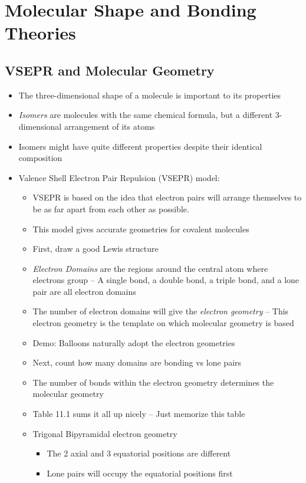 \documentclass[12pt, openany, letterpaper]{memoir}
\begin{document}
\chapter{Molecular Shape and Bonding Theories}
\section{VSEPR and Molecular Geometry}
\begin{itemize}
	\item The three-dimensional shape of a molecule is important to its properties
	\item \emph{Isomers} are molecules with the same chemical formula, but a different 3-dimensional arrangement of its atoms
	\item Isomers might have quite different properties despite their identical composition
	\item Valence Shell Electron Pair Repulsion (VSEPR) model:
	      \begin{itemize}
		      \item VSEPR is based on the idea that electron pairs will arrange themselves to be as far apart from each other as possible.
		      \item This model gives accurate geometries for covalent molecules
		      \item First, draw a good Lewis structure
		      \item \emph{Electron Domains} are the regions around the central atom where electrons group -- A single bond, a double bond, a triple bond, and a lone pair are all electron domains
		      \item The number of electron domains will give the \emph{electron geometry} -- This electron geometry is the template on which molecular geometry is based
		      \item Demo: Balloons naturally adopt the electron geometries
		      \item Next, count how many domains are bonding vs lone pairs
		      \item The number of bonds within the electron geometry determines the molecular geometry
		      \item Table 11.1 sums it all up nicely -- Just memorize this table
		      \item Trigonal Bipyramidal electron geometry
		            \begin{itemize}
			            \item The 2 axial and 3 equatorial positions are different
			            \item Lone pairs will occupy the equatorial positions first

\end{itemize}
\end{itemize}
\end{itemize}
\end{document}
